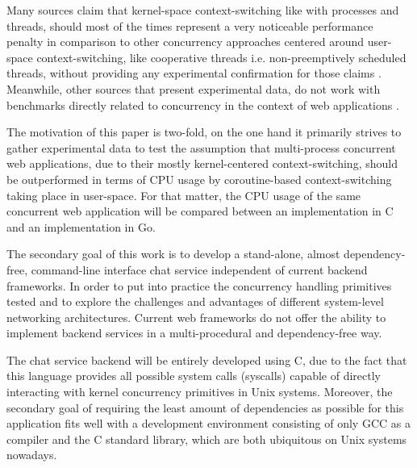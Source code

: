 Many sources claim that kernel-space context-switching like with processes and threads, should most of the times represent a very noticeable performance penalty in comparison to other concurrency approaches centered around user-space context-switching, like cooperative threads i.e. non-preemptively scheduled threads, without providing any experimental confirmation for those claims \cite{2003Events}\cite{2005Threads}\cite{Cox-Buday2017}\cite{Kerrisk2010}. Meanwhile, other sources that present experimental data, do not work with benchmarks directly related to concurrency in the context of web applications \cite{2013ContextSwitching}. 

The motivation of this paper is two-fold, on the one hand it primarily strives to gather experimental data to test the assumption that multi-process concurrent web applications, due to their mostly kernel-centered context-switching, should be outperformed in terms of CPU usage by coroutine-based context-switching taking place in user-space. For that matter, the CPU usage of the same concurrent web application will be compared between an implementation in C and an implementation in Go.

The secondary goal of this work is to develop a stand-alone, almost dependency-free, command-line interface chat service independent of current backend frameworks. In order to put into practice the concurrency handling primitives tested and to explore the challenges and advantages of different system-level networking architectures. Current web frameworks do not offer the ability to implement backend services in a multi-procedural and dependency-free way. 

The chat service backend will be entirely developed using C, due to the fact that this language provides all possible system calls (syscalls) capable of directly interacting with kernel concurrency primitives in Unix systems. Moreover, the secondary goal of requiring the least amount of dependencies as possible for this application fits well with a development environment consisting of only GCC as a compiler and the C standard library, which are both ubiquitous on Unix systems nowadays. 

